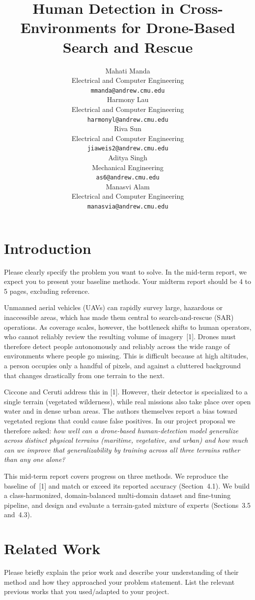 \documentclass{article}
\title{Human Detection in Cross-Environments for Drone-Based Search and Rescue}
\author{%
  Mahati Manda \\
  Electrical and Computer Engineering \\
  \texttt{mmanda@andrew.cmu.edu} \\
  \And
  Harmony Lau \\
  Electrical and Computer Engineering \\
  \texttt{harmonyl@andrew.cmu.edu} \\
  \And
  Riva Sun \\
  Electrical and Computer Engineering \\
  \texttt{jiaweis2@andrew.cmu.edu} \\
  \AND
  Aditya Singh \\
  Mechanical Engineering \\
  \texttt{as6@andrew.cmu.edu} \\
  \And
  Manasvi Alam \\
  Electrical and Computer Engineering \\
  \texttt{manasvia@andrew.cmu.edu} \\
}
\begin{document}
\maketitle

\section{Introduction}
Please clearly specify the problem you want to solve. In the mid-term report, we expect you to present your baseline methods. Your midterm report should be 4 to 5 pages, excluding reference.

Unmanned aerial vehicles (UAVs) can rapidly survey large, hazardous or inaccessible areas, which has made them central to search-and-rescue (SAR) operations. As coverage scales, however, the bottleneck shifts to human operators, who cannot reliably review the resulting volume of imagery~[1]. Drones must therefore detect people autonomously and reliably across the wide range of environments where people go missing. This is difficult because at high altitudes, a person occupies only a handful of pixels, and against a cluttered background that changes drastically from one terrain to the next.
 
Ciccone and Ceruti address this in [1]. However, their detector is specialized to a single terrain (vegetated wilderness), while real missions also take place over open water and in dense urban areas. The authors themselves report a bias toward vegetated regions that could cause false positives. In our project proposal we therefore asked: \emph{how well can a drone-based human-detection model generalize across distinct physical terrains (maritime, vegetative, and urban) and how much can we improve that generalizability by training across all three terrains rather than any one alone?}
 
This mid-term report covers progress on three methods. We reproduce the baseline of~[1] and match or exceed its reported accuracy (Section~4.1). We build a class-harmonized, domain-balanced multi-domain dataset and fine-tuning pipeline, and design and evaluate a terrain-gated mixture of experts (Sections~3.5 and~4.3).

\section{Related Work}
Please briefly explain the prior work and describe your understanding of their method and how they approached your problem statement. List the relevant previous works that you used/adapted to your project.
\end{document}
